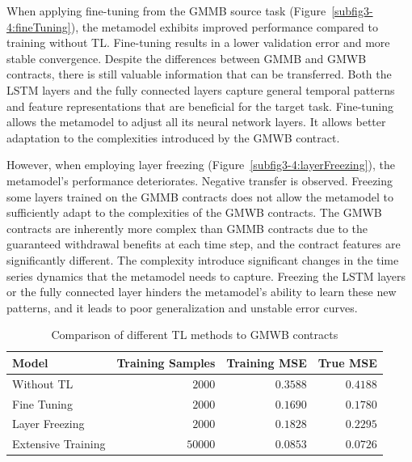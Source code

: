 When applying fine-tuning from the GMMB source task (Figure~\ref{subfig3-4:fineTuning}), the metamodel exhibits improved performance compared to training without TL. 
Fine-tuning results in a lower validation error and more stable convergence.
Despite the differences between GMMB and GMWB contracts, there is still valuable information that can be transferred. 
Both the LSTM layers and the fully connected layers capture general temporal patterns and feature representations that are beneficial for the target task. 
Fine-tuning allows the metamodel to adjust all its neural network layers. 
It allows better adaptation to the complexities introduced by the GMWB contract.

However, when employing layer freezing (Figure~\ref{subfig3-4:layerFreezing}), the metamodel's performance deteriorates.
Negative transfer is observed.
Freezing some layers trained on the GMMB contracts does not allow the metamodel to sufficiently adapt to the complexities of the GMWB contracts. 
The GMWB contracts are inherently more complex than GMMB contracts due to the guaranteed withdrawal benefits at each time step, and the contract features are significantly different.
The complexity introduce significant changes in the time series dynamics that the metamodel needs to capture.
Freezing the LSTM layers or the fully connected layer hinders the metamodel's ability to learn these new patterns, and it leads to poor generalization and unstable error curves.

\begin{table}[ht!]
    \centering
    \begin{tabular}{lrrr}
        \toprule
        \textbf{Model} & \textbf{Training Samples} & \textbf{Training MSE} & \textbf{True MSE} \\
        \midrule
        Without TL & $\num{2000}$ & $0.3588$ & $0.4188$ \\
        Fine Tuning & $\num{2000}$ & $0.1690$ & $0.1780$ \\
        Layer Freezing & $\num{2000}$ & $0.1828$ & $0.2295$ \\
        Extensive Training & $\num{50000}$ & $0.0853$ & $0.0726$ \\
        \bottomrule
    \end{tabular}
    \caption{Comparison of different TL methods to GMWB contracts}
    \label{tab3:transfer_learning_results_gmwb}
\end{table}

